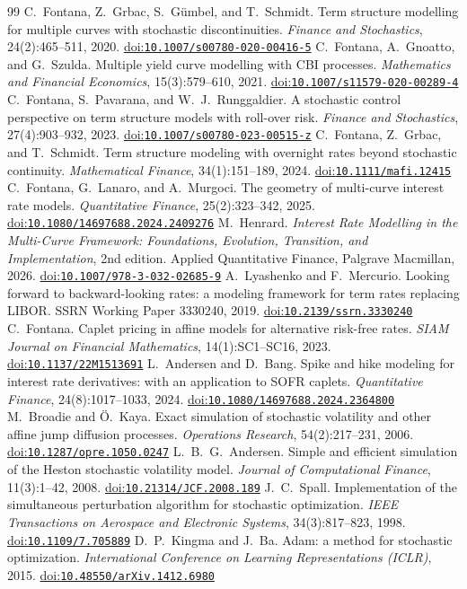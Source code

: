 \documentclass[11pt]{article}
\newcommand{\doi}[1]{\href{https://doi.org/#1}{doi:\nolinkurl{#1}}}
\begin{document}
\begin{thebibliography}{99}
 C.~Fontana, Z.~Grbac, S.~G\"umbel, and T.~Schmidt.
  Term structure modelling for multiple curves with stochastic discontinuities.
  \emph{Finance and Stochastics}, 24(2):465--511, 2020. \doi{10.1007/s00780-020-00416-5}
 C.~Fontana, A.~Gnoatto, and G.~Szulda.
  Multiple yield curve modelling with {CBI} processes.
  \emph{Mathematics and Financial Economics}, 15(3):579--610, 2021. \doi{10.1007/s11579-020-00289-4}
 C.~Fontana, S.~Pavarana, and W.~J.~Runggaldier.
  A stochastic control perspective on term structure models with roll-over risk.
  \emph{Finance and Stochastics}, 27(4):903--932, 2023. \doi{10.1007/s00780-023-00515-z}
 C.~Fontana, Z.~Grbac, and T.~Schmidt.
  Term structure modeling with overnight rates beyond stochastic continuity.
  \emph{Mathematical Finance}, 34(1):151--189, 2024. \doi{10.1111/mafi.12415}
 C.~Fontana, G.~Lanaro, and A.~Murgoci.
  The geometry of multi-curve interest rate models.
  \emph{Quantitative Finance}, 25(2):323--342, 2025. \doi{10.1080/14697688.2024.2409276}
 M.~Henrard.
  \emph{Interest Rate Modelling in the Multi-Curve Framework: Foundations, Evolution, Transition,
  and Implementation}, 2nd edition. Applied Quantitative Finance, Palgrave Macmillan, 2026.
  \doi{10.1007/978-3-032-02685-9}
 A.~Lyashenko and F.~Mercurio.
  Looking forward to backward-looking rates: a modeling framework for term rates replacing LIBOR.
  SSRN Working Paper 3330240, 2019. \doi{10.2139/ssrn.3330240}
 C.~Fontana.
  Caplet pricing in affine models for alternative risk-free rates.
  \emph{SIAM Journal on Financial Mathematics}, 14(1):SC1--SC16, 2023. \doi{10.1137/22M1513691}
 L.~Andersen and D.~Bang.
  Spike and hike modeling for interest rate derivatives: with an application to SOFR caplets.
  \emph{Quantitative Finance}, 24(8):1017--1033, 2024. \doi{10.1080/14697688.2024.2364800}
 M.~Broadie and \"{O}.~Kaya.
  Exact simulation of stochastic volatility and other affine jump diffusion processes.
  \emph{Operations Research}, 54(2):217--231, 2006. \doi{10.1287/opre.1050.0247}
 L.~B.~G.~Andersen.
  Simple and efficient simulation of the Heston stochastic volatility model.
  \emph{Journal of Computational Finance}, 11(3):1--42, 2008. \doi{10.21314/JCF.2008.189}
 J.~C.~Spall.
  Implementation of the simultaneous perturbation algorithm for stochastic optimization.
  \emph{IEEE Transactions on Aerospace and Electronic Systems}, 34(3):817--823, 1998.
  \doi{10.1109/7.705889}
 D.~P.~Kingma and J.~Ba.
  Adam: a method for stochastic optimization.
  \emph{International Conference on Learning Representations (ICLR)}, 2015.
  \doi{10.48550/arXiv.1412.6980}
\end{thebibliography}
\end{document}
